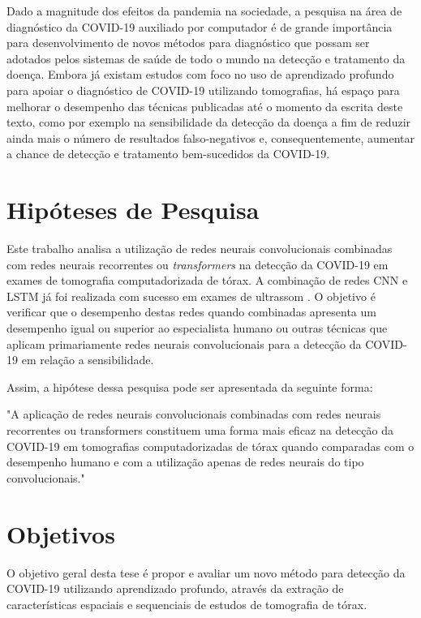 Dado a magnitude dos efeitos da pandemia na sociedade, a pesquisa na área de diagnóstico da COVID-19 auxiliado por computador é de grande importância para desenvolvimento de novos métodos para diagnóstico que possam ser adotados pelos sistemas de saúde de todo o mundo na detecção e tratamento da doença. Embora já existam estudos com foco no uso de aprendizado profundo para apoiar o diagnóstico de COVID-19 utilizando tomografias, há espaço para melhorar o desempenho das técnicas publicadas até o momento da escrita deste texto, como por exemplo na sensibilidade da detecção da doença a fim de reduzir ainda mais o número de resultados falso-negativos e, consequentemente, aumentar a chance de detecção e tratamento bem-sucedidos da COVID-19.

\section{Hipóteses de Pesquisa}\label{sec:obj_perg_hipoteses}

Este trabalho analisa a utilização de redes neurais convolucionais \cite{lecun1990handwritten} combinadas com redes neurais recorrentes \cite{Rumelhart1986} ou \textit{transformers} \cite{vaswani2017attention} na detecção da COVID-19 em exames de tomografia computadorizada de tórax. A combinação de redes CNN e LSTM já foi realizada com sucesso em exames de ultrassom \cite{barros2021pulmonary}. O objetivo é verificar que o desempenho destas redes quando combinadas apresenta um desempenho igual ou superior ao especialista humano ou outras técnicas que aplicam primariamente redes neurais convolucionais para a detecção da COVID-19 em relação a sensibilidade.

Assim, a hipótese dessa pesquisa pode ser apresentada da seguinte forma: 

"A aplicação de redes neurais convolucionais combinadas com redes neurais recorrentes ou transformers constituem uma forma mais eficaz na detecção da COVID-19 em tomografias computadorizadas de tórax quando comparadas com o desempenho humano e com a utilização apenas de redes neurais do tipo convolucionais."

\section{Objetivos}\label{sec:obj_trabalho}

O objetivo geral desta tese é propor e avaliar um novo método para detecção da COVID-19 utilizando aprendizado profundo, através da extração de características espaciais e sequenciais de estudos de tomografia de tórax. 

